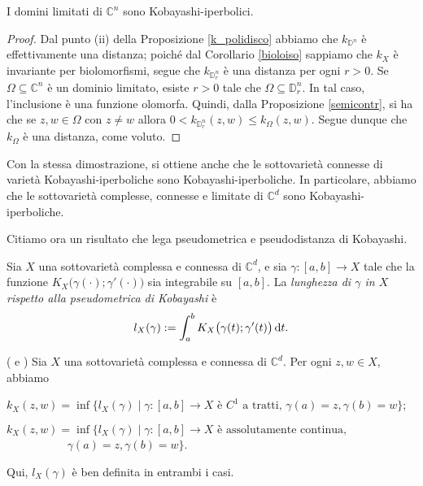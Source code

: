 \begin{cor}
    I domini limitati di $\mathbb{C}^n$ sono Kobayashi-iperbolici.
\end{cor}
\begin{proof}
    Dal punto (ii) della Proposizione \ref{k_polidisco} abbiamo che $k_{\mathbb{D}^n}$ è effettivamente una distanza; poiché dal Corollario \ref{bioloiso} sappiamo che $k_X$ è invariante per biolomorfismi, segue che $k_{\mathbb{D}_r^n}$ è una distanza per ogni $r>0$. Se $\Omega\subseteq\mathbb{C}^n$ è un dominio limitato, esiste $r>0$ tale che $\Omega\subseteq\mathbb{D}_r^n$. In tal caso, l'inclusione è una funzione olomorfa. Quindi, dalla Proposizione \ref{semicontr}, si ha che se $z,w \in \Omega$ con $z\not=w$ allora $0<k_{\mathbb{D}_r^n}(z,w) \le k_{\Omega}(z,w)$. Segue dunque che $k_\Omega$ è una distanza, come voluto.
\end{proof}

\begin{oss} \label{kobisdist}
    Con la stessa dimostrazione, si ottiene anche che le sottovarietà connesse di varietà Kobayashi-iperboliche sono Kobayashi-iperboliche. In particolare, abbiamo che le sottovarietà complesse, connesse e limitate di $\mathbb{C}^d$ sono Kobayashi-iperboliche.
\end{oss}

Citiamo ora un risultato che lega pseudometrica e pseudodistanza di Kobayashi.

\begin{defn} \label{lung_X}
    Sia $X$ una sottovarietà complessa e connessa di $\mathbb{C}^d$, e sia $\gamma:[a,b] \longrightarrow X$ tale che la funzione $K_X\big(\gamma(\cdot);\gamma'(\cdot)\big)$ sia integrabile su $[a,b]$. La \textit{lunghezza di $\gamma$ in $X$ rispetto alla pseudometrica di Kobayashi} è
    $$l_X(\gamma):=\int_a^b K_X\big(\gamma(t);\gamma'(t)\big)\mathop{}\!\mathrm{d} t.$$
\end{defn}

\begin{thm} \label{lung_int}
    (\cite[Theorem 1]{R} e \cite[Theorem 3.1]{V}) Sia $X$ una sottovarietà complessa e connessa di $\mathbb{C}^d$. Per ogni $z,w \in X$, abbiamo
    \begin{nlist}
        \item $k_X(z,w)=\inf\{l_X(\gamma) \mid \gamma:[a,b] \longrightarrow X\text{ è $C^1$ a tratti, }\gamma(a)=z,\gamma(b)=w\}$;
        \item $k_X(z,w)=\inf\{l_X(\gamma) \mid \gamma:[a,b] \longrightarrow X\text{ è assolutamente continua,}$\\
        $\text{    }\qquad\qquad\,\,\,\,\gamma(a)=z,\gamma(b)=w\}$.
    \end{nlist}

    Qui, $l_X(\gamma)$ è ben definita in entrambi i casi.
\end{thm}

